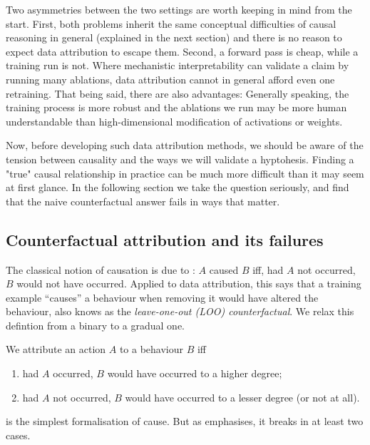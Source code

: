 \documentclass[11pt]{article}
\begin{document}
Two asymmetries between the two settings are worth keeping in mind from the start. First, both problems inherit the same conceptual difficulties of causal reasoning in general (explained in the next section) and there is no reason to expect data attribution to escape them. Second, a forward pass is cheap, while a training run is not. Where mechanistic interpretability can validate a claim by running many ablations, data attribution cannot in general afford even one retraining. That being said, there are also advantages: Generally speaking, the training process is more robust and the ablations we run may be more human understandable than high-dimensional modification of activations or weights.

Now, before developing such data attribution methods, we should be aware of the tension between causality and the ways we will validate a hyptohesis. Finding a "true" causal relationship in practice can be much more difficult than it may seem at first glance.
In the following section we take the question seriously, and find that the naive counterfactual answer fails in ways that matter.


\subsection{Counterfactual attribution and its failures}\label{subsec:counterfactual}

The classical notion of causation is due to \citet{lewis1973causation}: $A$ caused $B$ iff, had $A$ not occurred, $B$ would not have occurred. Applied to data attribution, this says that a training example ``causes'' a behaviour when removing it would have altered the behaviour, also knows as the \emph{leave-one-out (LOO) counterfactual}. We relax this defintion from a binary to a gradual one.

\begin{definition}\label{def:counterfactual}
  We attribute an action $A$ to a behaviour $B$ iff
  \begin{enumerate}[label=(\roman*)]
    \item had $A$ occurred, $B$ would have occurred to a higher degree;
    \item had $A$ not occurred, $B$ would have occurred to a lesser degree (or not at all).
  \end{enumerate}
\end{definition}

 is the simplest formalisation of cause. But as \citet{mueller} emphasises, it breaks in at least two cases.
\end{document}
